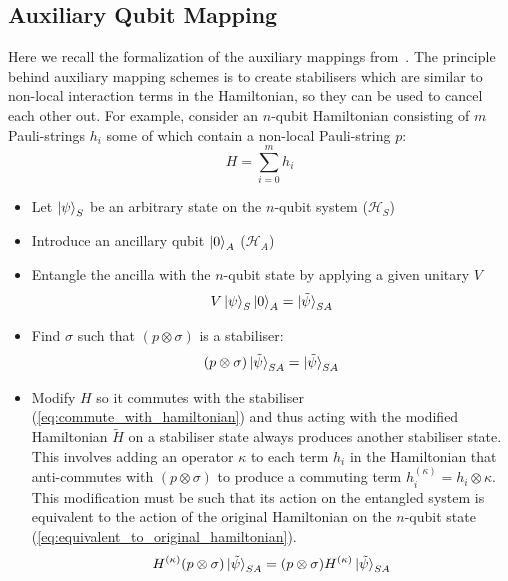 \documentclass[pdftex,pra,aps,twocolumn,twoside]{revtex4-2}
\theoremstyle{plain}
\theoremstyle{note}
\newcommand\+{{\footnotesize \raisebox{0.3ex}{+}}}
\begin{document}
\subsection{Auxiliary Qubit Mapping}
\label{section:auxillaryMappings}
Here we recall the formalization of the auxiliary mappings from~\cite{steudtner2019quantum}. The principle behind auxiliary mapping schemes is to create stabilisers which are similar to non-local interaction terms in the Hamiltonian, so they can be used to cancel each other out. For example, consider an $n$-qubit Hamiltonian consisting of $m$ Pauli-strings $h_i$ some of which contain a non-local Pauli-string $p$:
\begin{equation}
    H = \sum_{i=0}^m h_i
\end{equation}
\begin{itemize}
\item Let $\ket{\psi}_S$ be an arbitrary state on the $n$-qubit system ($\mathcal{H}_S$)
\item Introduce an ancillary qubit $\ket{0}_A$ ($\mathcal{H}_A$)
\item Entangle the ancilla with the $n$-qubit state by applying a given unitary $V$
\begin{equation}
    V \ket{\psi}_S \ket{0}_A = \ket{\tilde \psi}_{SA}
\end{equation}
\item Find $\sigma$ such that $(p \otimes \sigma)$ is a stabiliser:
\begin{equation}
    (p \otimes \sigma) \ket{\tilde \psi}_{SA} = \ket{\tilde \psi}_{SA}
\end{equation}
\item Modify $H$ so it commutes with the stabiliser (\ref{eq:commute_with_hamiltonian}) and thus acting with the modified Hamiltonian $\tilde H$ on a stabiliser state always produces another stabiliser state. This involves adding an operator $\kappa$ to each term $h_i$ in the Hamiltonian that anti-commutes with $(p \otimes \sigma)$ to produce a commuting term $h_i^{(\kappa)} = h_i \otimes \kappa$. This modification must be such that its action on the entangled system is equivalent to the action of the original Hamiltonian on the $n$-qubit state (\ref{eq:equivalent_to_original_hamiltonian}).
\begin{equation}
\label{eq:commute_with_hamiltonian}
    H^{(\kappa)}(p \otimes \sigma)  \ket{\tilde \psi}_{SA} =(p \otimes \sigma)  H^{(\kappa)}\ket{\tilde \psi}_{SA}  
\end{equation}
\begin{equation}

\end{equation}
\end{itemize}
\end{document}
